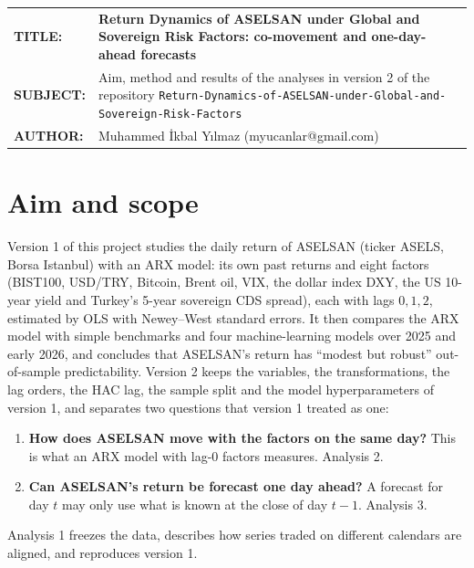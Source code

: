 \documentclass[11pt,a4paper]{article}
\begin{document}
\vspace*{14pt}
\begin{tabular}{@{}p{2.35cm}@{}p{\dimexpr\textwidth-2.35cm}@{}}
\textbf{TITLE:} & \textbf{\large Return Dynamics of ASELSAN under Global and Sovereign Risk Factors: co-movement and one-day-ahead forecasts}\\[3pt]
\textbf{SUBJECT:} & Aim, method and results of the analyses in version 2 of the repository\newline
\texttt{Return-Dynamics-of-ASELSAN-under-}\newline\texttt{Global-and-Sovereign-Risk-Factors}\\[3pt]
\textbf{AUTHOR:} & Muhammed İkbal Yılmaz (myucanlar@gmail.com)
\end{tabular}

\vspace{8pt}
\vspace{12pt}

\section{Aim and scope}

Version 1 of this project studies the daily return of ASELSAN (ticker ASELS, Borsa Istanbul) with an ARX model: its own past
returns and eight factors (BIST100, USD/TRY, Bitcoin, Brent oil, VIX, the dollar index DXY, the US 10-year yield and Turkey's
5-year sovereign CDS spread), each with lags $0, 1, 2$, estimated by OLS with Newey--West standard errors. It then compares the
ARX model with simple benchmarks and four machine-learning models over 2025 and early 2026, and concludes that ASELSAN's return
has ``modest but robust'' out-of-sample predictability. Version 2 keeps the variables, the transformations, the lag orders, the
HAC lag, the sample split and the model hyperparameters of version 1, and separates two questions that version 1 treated as one:

\begin{enumerate}
  \item \textbf{How does ASELSAN move with the factors on the same day?} This is what an ARX model with lag-0 factors measures.
  Analysis 2.
  \item \textbf{Can ASELSAN's return be forecast one day ahead?} A forecast for day $t$ may only use what is known at the close of
  day $t-1$. Analysis 3.
\end{enumerate}

Analysis 1 freezes the data, describes how series traded on different calendars are aligned, and reproduces version 1.
\end{document}

